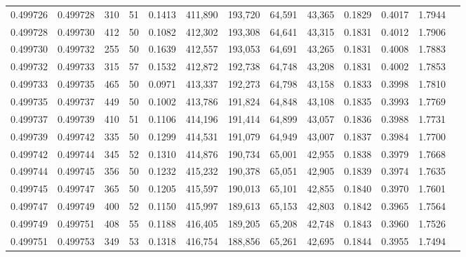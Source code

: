 \begin{tabular}{rrrrrrrrrrrrr}
0.499726 & 0.499728 & 310 &  51 &                                     0.1413 & 411,890 & 193,720 &  64,591 &  43,365 & 0.1829 & 0.4017 & 1.7944 \\
0.499728 & 0.499730 & 412 &  50 &                                     0.1082 & 412,302 & 193,308 &  64,641 &  43,315 & 0.1831 & 0.4012 & 1.7906 \\
0.499730 & 0.499732 & 255 &  50 &                                     0.1639 & 412,557 & 193,053 &  64,691 &  43,265 & 0.1831 & 0.4008 & 1.7883 \\
0.499732 & 0.499733 & 315 &  57 &                                     0.1532 & 412,872 & 192,738 &  64,748 &  43,208 & 0.1831 & 0.4002 & 1.7853 \\
0.499733 & 0.499735 & 465 &  50 &                                     0.0971 & 413,337 & 192,273 &  64,798 &  43,158 & 0.1833 & 0.3998 & 1.7810 \\
0.499735 & 0.499737 & 449 &  50 &                                     0.1002 & 413,786 & 191,824 &  64,848 &  43,108 & 0.1835 & 0.3993 & 1.7769 \\
0.499737 & 0.499739 & 410 &  51 &                                     0.1106 & 414,196 & 191,414 &  64,899 &  43,057 & 0.1836 & 0.3988 & 1.7731 \\
0.499739 & 0.499742 & 335 &  50 &                                     0.1299 & 414,531 & 191,079 &  64,949 &  43,007 & 0.1837 & 0.3984 & 1.7700 \\
0.499742 & 0.499744 & 345 &  52 &                                     0.1310 & 414,876 & 190,734 &  65,001 &  42,955 & 0.1838 & 0.3979 & 1.7668 \\
0.499744 & 0.499745 & 356 &  50 &                                     0.1232 & 415,232 & 190,378 &  65,051 &  42,905 & 0.1839 & 0.3974 & 1.7635 \\
0.499745 & 0.499747 & 365 &  50 &                                     0.1205 & 415,597 & 190,013 &  65,101 &  42,855 & 0.1840 & 0.3970 & 1.7601 \\
0.499747 & 0.499749 & 400 &  52 &                                     0.1150 & 415,997 & 189,613 &  65,153 &  42,803 & 0.1842 & 0.3965 & 1.7564 \\
0.499749 & 0.499751 & 408 &  55 &                                     0.1188 & 416,405 & 189,205 &  65,208 &  42,748 & 0.1843 & 0.3960 & 1.7526 \\
0.499751 & 0.499753 & 349 &  53 &                                     0.1318 & 416,754 & 188,856 &  65,261 &  42,695 & 0.1844 & 0.3955 & 1.7494 \\

\end{tabular}
